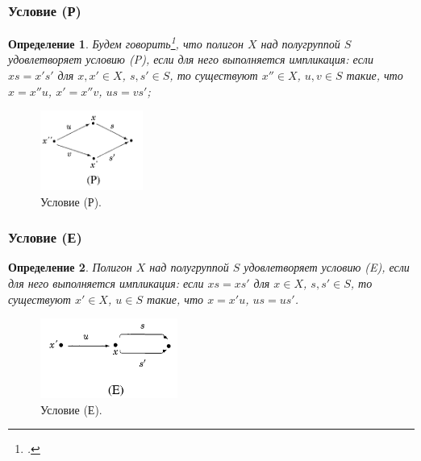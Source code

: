 \documentclass[11pt, notheorems]{beamer}
\newtheorem{definition}{Определение}
\begin{document}
\begin{frame}
	\frametitle{Условие (Р)}

	\begin{definition}
		Будем говорить\footcite[определение III.9.4]{kilp}, что полигон $X$ над полугруппой $S$ удовлетворяет условию (P), если для него выполняется импликация: если $xs = x' s'$ для $x, x' \in X$, $s, s' \in S$, то существуют $x'' \in X$, $u,v \in S$ такие, что $x = x'' u$, $x' = x'' v$, $u s = v s'$;
	\end{definition}

	\begin{figure}
		\center
		\includegraphics[width=0.3\textwidth]{cond_p.png}
		\caption{Условие (Р).}
	\end{figure}
\end{frame}

\begin{frame}
	\frametitle{Условие (Е)}

	\begin{definition}
		Полигон $X$ над полугруппой $S$ удовлетворяет условию (E), если для него выполняется импликация: если $x s = x s'$ для $x \in X$, $s, s' \in S$, то существуют $x' \in X$, $u \in S$ такие, что $x = x' u$, $us = us'$.
	\end{definition}

	\begin{figure}
		\center
		\includegraphics[width=0.4\textwidth]{cond_e.png}
		\caption{Условие (Е).}
	\end{figure}
\end{frame}
\end{document}

